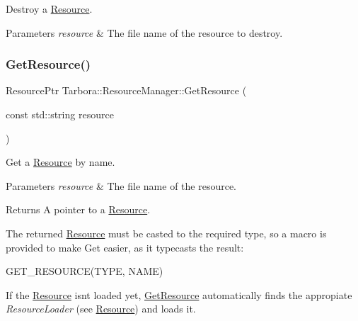 Destroy a \hyperlink{classTarbora_1_1Resource}{Resource}. 


\begin{DoxyParams}{Parameters}
{\em resource} & The file name of the resource to destroy. \\
\hline
\end{DoxyParams}
\mbox{\label{classTarbora_1_1ResourceManager_a755c3216ac424ec13d28fa84b0814e0b}} 
\subsubsection{\texorpdfstring{Get\+Resource()}{GetResource()}}
{\footnotesize\ttfamily Resource\+Ptr Tarbora\+::\+Resource\+Manager\+::\+Get\+Resource (\begin{DoxyParamCaption}\item[{const std\+::string}]{resource }\end{DoxyParamCaption})\hspace{0.3cm}{\ttfamily [static]}}



Get a \hyperlink{classTarbora_1_1Resource}{Resource} by name. 


\begin{DoxyParams}{Parameters}
{\em resource} & The file name of the resource. \\
\hline
\end{DoxyParams}
\begin{DoxyReturn}{Returns}
A pointer to a \hyperlink{classTarbora_1_1Resource}{Resource}.
\end{DoxyReturn}
The returned \hyperlink{classTarbora_1_1Resource}{Resource} must be casted to the required type, so a macro is provided to make Get easier, as it typecasts the result\+: 
\begin{DoxyCode}
GET\_RESOURCE(TYPE, NAME)
\end{DoxyCode}


If the \hyperlink{classTarbora_1_1Resource}{Resource} isn\textquotesingle{}t loaded yet, \hyperlink{classTarbora_1_1ResourceManager_a755c3216ac424ec13d28fa84b0814e0b}{Get\+Resource} automatically finds the appropiate {\itshape Resource\+Loader} (see \hyperlink{classTarbora_1_1Resource}{Resource}) and loads it. \mbox{\label{classTarbora_1_1ResourceManager_a92a90cbe0795350a30b45ba1f6e14a7f}} 
